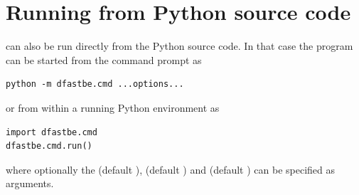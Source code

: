 \section{Running from Python source code}
\dfastbe can also be run directly from the Python source code.
In that case the program can be started from the command prompt as

\begin{Verbatim}
python -m dfastbe.cmd ...options...
\end{Verbatim}

or from within a running Python environment as

\begin{Verbatim}
import dfastbe.cmd
dfastbe.cmd.run()
\end{Verbatim}

where optionally the  (default ),  (default ) and  (default ) can be specified as arguments.